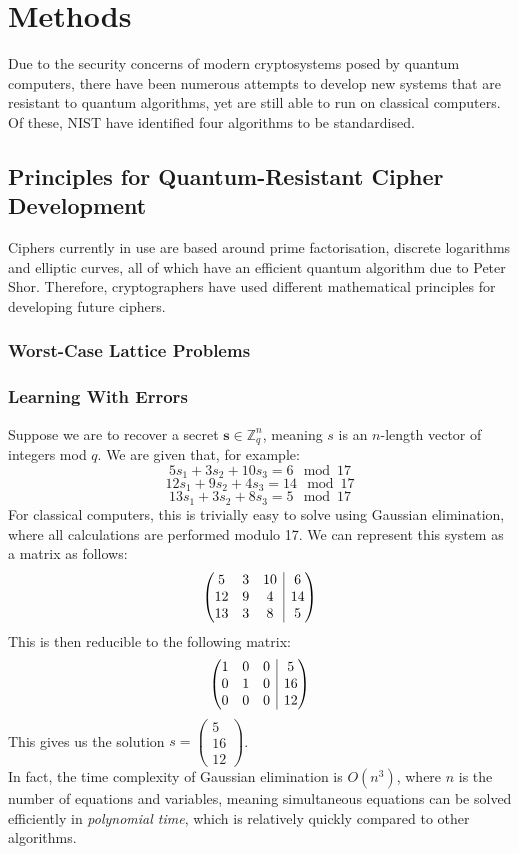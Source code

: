 \documentclass{article}
\begin{document}
\section{Methods}
Due to the security concerns of modern cryptosystems posed by quantum
computers, there have been numerous attempts to develop new systems that are
resistant to quantum algorithms, yet are still able to run on classical
computers. Of these, NIST have identified four algorithms to be standardised.

\subsection{Principles for Quantum-Resistant Cipher Development}
Ciphers currently in use are based around prime factorisation, discrete
logarithms and elliptic curves, all of which have an efficient quantum
algorithm due to Peter Shor. Therefore, cryptographers have used different
mathematical principles for developing future ciphers.

\subsubsection{Worst-Case Lattice Problems}
\subsubsection{Learning With Errors}
Suppose we are to recover a secret $\bm{s} \in \mathbb{Z}^{n}_{q}$, meaning $s$ is an $n$-length vector of integers mod $q$.
We are given that, for example:
\[ 5s_{1} + 3s_{2} + 10s_{3} = 6 \mod{17} \] 
\[ 12s_{1} + 9s_{2} + 4s_{3} = 14 \mod{17} \] 
\[ 13s_{1} + 3s_{2} + 8s_{3} = 5 \mod{17} \] 
For classical computers, this is trivially easy to solve using Gaussian
elimination, where all calculations are performed modulo 17. We can represent
this system as a matrix as follows:
\[
\left(\begin{array}{@{}ccc|c@{}}
   5 & 3 & 10 & 6 \\
   12 & 9 & 4 & 14 \\
   13 & 3 & 8 & 5
\end{array}\right)
\]
This is then reducible to the following matrix:
\[
\left(\begin{array}{@{}ccc|c@{}}
   1 & 0 & 0 & 5 \\
   0 & 1 & 0 & 16 \\
   0 & 0 & 0 & 12
\end{array}\right)
\]
This gives us the solution $s = \begin{pmatrix} 5 \\ 16 \\ 12 \end{pmatrix}$. \\
In fact, the time complexity of Gaussian elimination is $O(n^{3})$, where $n$
is the number of equations and variables, meaning simultaneous equations can be
solved efficiently in \textit{polynomial time}, which is relatively quickly
compared to other algorithms.
\\
\end{document}
